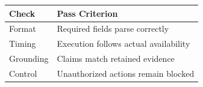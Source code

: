 \begin{tabular}{@{}P{4.0cm}P{8.5cm}@{}}
\toprule
\textbf{Check} & \textbf{Pass Criterion} \\
\midrule
Format & Required fields parse correctly \\
Timing & Execution follows actual availability \\
Grounding & Claims match retained evidence \\
Control & Unauthorized actions remain blocked \\
\bottomrule
\end{tabular}
